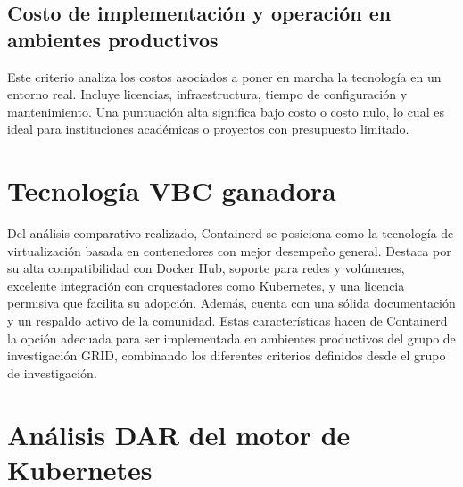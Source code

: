 \subsection{Costo de implementación y operación en ambientes productivos}
Este criterio analiza los costos asociados a poner en marcha la tecnología en un entorno real. Incluye licencias, infraestructura, tiempo de configuración y mantenimiento. Una puntuación alta significa bajo costo o costo nulo, lo cual es ideal para instituciones académicas o proyectos con presupuesto limitado.

\section{Tecnología VBC ganadora}

Del análisis comparativo realizado, Containerd se posiciona como la tecnología de virtualización basada en contenedores con mejor desempeño general. Destaca por su alta compatibilidad con Docker Hub, soporte para redes y volúmenes, excelente integración con orquestadores como Kubernetes, y una licencia permisiva que facilita su adopción. Además, cuenta con una sólida documentación y un respaldo activo de la comunidad. Estas características hacen de Containerd la opción adecuada para ser implementada en ambientes productivos del grupo de investigación GRID, combinando los diferentes criterios definidos desde el grupo de investigación.

\section{Análisis DAR del motor de Kubernetes}

